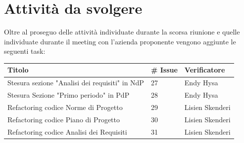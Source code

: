 \documentclass{article}
\begin{document}
\section{Attività da svolgere}
Oltre al proseguo delle attività individuate durante la scorsa riunione e quelle individuate durante il meeting con l'azienda proponente vengono aggiunte le seguenti task: 

    \begin{center}
        \begin{tabular}{|C{7cm}|C{1,5cm}|C{3cm}|}
            \hline
            \textbf{Titolo} & \textbf{\# Issue} & \textbf{Verificatore} \\
            \hline\hline
            Stesura sezione "Analisi dei requisiti" in NdP & 27 & Endy Hysa \\
            Stesura Sezione "Primo periodo" in PdP & 28 & Endy Hysa \\
            Refactoring codice Norme di Progetto & 29 & Lisien Skenderi \\
            Refactoring codice Piano di Progetto & 30 & Lisien Skenderi \\
            Refactoring codice Analisi dei Requisiti & 31 & Lisien Skenderi \\
            \hline
        \end{tabular}
    \end{center}
\end{document}
